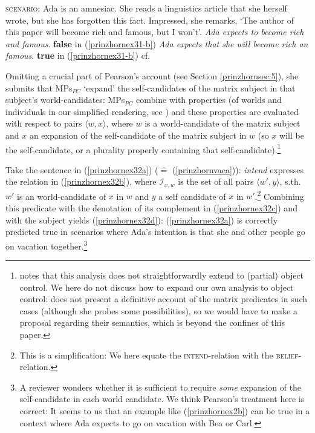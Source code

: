 \documentclass[output=paper,colorlinks,citecolor=brown,
]{langscibook}
\begin{document}
\ea 
\ea  \textsc{scenario:} Ada is an amnesiac. She reads a linguistics article that she herself wrote, but she has forgotten this fact. Impressed, she remarks, `The author of this paper will become rich
and famous, but I won't'. \label{prinzhornex31-b}
\ex  \textit{Ada expects to become rich and famous}. \hfill \textbf{false} in (\ref{prinzhornex31-b}) \label{prinzhornex31-c}
\ex \textit{Ada expects that she will become rich an famous}.  \hfill \textbf{true} in (\ref{prinzhornex31-b})
\newline \phantom{.}\hfill cf. \cite[(9)]{Pearson:2016} \label{prinzhornex31-d}
\z\z 

Omitting a crucial part of Pearson's account (see Section \ref{prinzhornsec:5}), she submits that MPs$_{PC}$ `expand' the self-candidates of the matrix subject in that subject's world-candidates: MPs$_{PC}$ combine with properties (of worlds and individuals in our simplified rendering, see \citealt{Chierchia:1989}) and these properties are evaluated with respect to pairs $\langle w, x \rangle$, where $w$ is a world-candidate of the matrix subject and $x$ an expansion of the self-candidate of the matrix subject in $w$ (so $x$ will be the self-candidate, or a plurality properly containing that self-candidate).\footnote{\cite{Pearson:2016} notes that this analysis does not straightforwardly extend to (partial) object control. We here do not discuss how to expand our own analysis to object control: \cite{Pearson:2016} does not present a definitive account of the matrix predicates in such cases (although she probes some possibilities), so we would have to make a proposal regarding their semantics, which is beyond the confines of this paper.}

Take the sentence in (\ref{prinzhornex32a}) ($\widehat{=}$ (\ref{prinzhornvaca})): \textit{intend} expresses the relation in (\ref{prinzhornex32b}), where  $\mathcal{I}_{x,w}$ is the set of all pairs $\langle w',y \rangle$, s.th. $w'$ is an world-candidate of $x$ in $w$ and $y$ a self candidate of $x$ in $w'$.\footnote{This is a simplification: We here equate the \textsc{intend}-relation with the \textsc{belief}-relation.} Combining this predicate with the denotation of its complement in (\ref{prinzhornex32c}) and with the subject yields (\ref{prinzhornex32d}): (\ref{prinzhornex32a}) is correctly predicted true in scenarios where Ada's intention is that she and other people  go on vacation together.\footnote{A reviewer wonders whether it is sufficient to require \textit{some} expansion of the self-candidate in each world candidate. We think Pearson's treatment here is correct: It seems to us that an example like (\ref{prinzhornex2b}) can be true in a context where Ada expects to go on vacation with Bea or Carl.}
\end{document}

